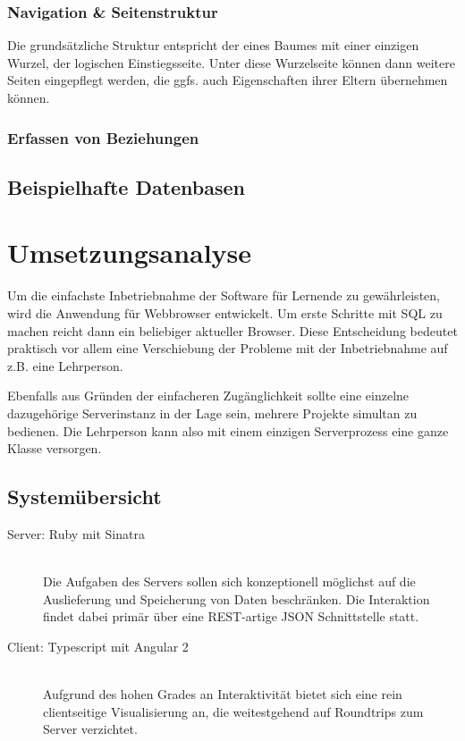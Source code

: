\documentclass[paper=a4,fontsize=11pt,parskip=half]{scrartcl}
\begin{document}
\subsubsection{Navigation \& Seitenstruktur}

Die grundsätzliche Struktur entspricht der eines Baumes mit einer einzigen Wurzel, der logischen Einstiegsseite. Unter diese Wurzelseite können dann weitere Seiten eingepflegt werden, die ggfs. auch Eigenschaften ihrer Eltern übernehmen können.

\subsubsection{Erfassen von Beziehungen}


\subsection{Beispielhafte Datenbasen}
\label{sec:example-queries}

\section{Umsetzungsanalyse}
\label{sec:implementation-analysis}


Um die einfachste Inbetriebnahme der Software für Lernende zu gewährleisten, wird die Anwendung für Webbrowser entwickelt. Um erste Schritte mit SQL zu machen reicht dann ein beliebiger aktueller Browser. Diese Entscheidung bedeutet praktisch vor allem eine Verschiebung der Probleme mit der Inbetriebnahme auf z.B. eine Lehrperson.

Ebenfalls aus Gründen der einfacheren Zugänglichkeit sollte eine einzelne dazugehörige Serverinstanz in der Lage sein, mehrere Projekte simultan zu bedienen. Die Lehrperson kann also mit einem einzigen Serverprozess eine ganze Klasse versorgen.

\subsection{Systemübersicht}

\begin{description}
\item[Server: Ruby mit Sinatra] \hfill\\
  Die Aufgaben des Servers sollen sich konzeptionell möglichst auf die Auslieferung und Speicherung von Daten beschränken. Die Interaktion findet dabei primär über eine REST-artige JSON Schnittstelle statt.
\item[Client: Typescript mit Angular 2] \hfill\\
  Aufgrund des hohen Grades an Interaktivität bietet sich eine rein clientseitige Visualisierung an, die weitestgehend auf Roundtrips zum Server verzichtet.
\end{description}
\end{document}
